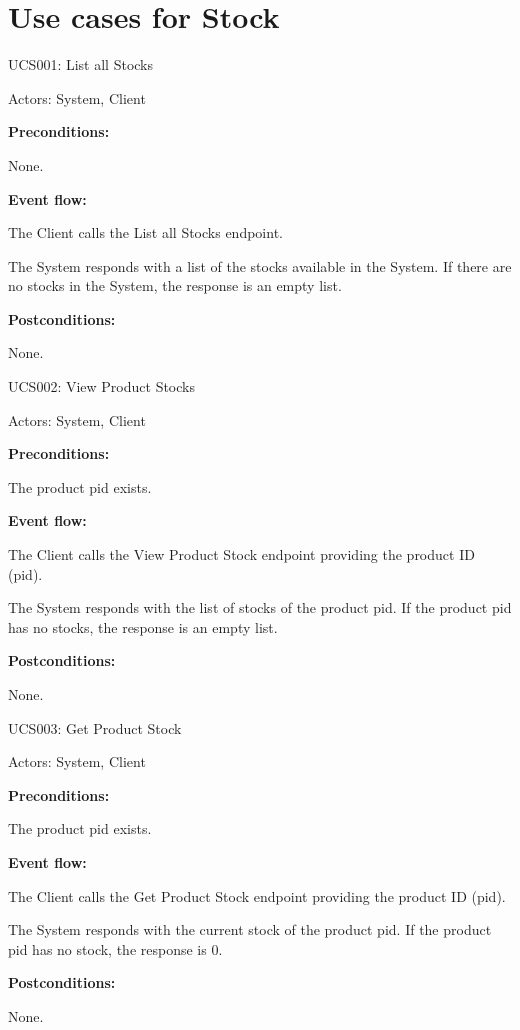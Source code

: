 \section{Use cases for Stock}

\begin{ucbox}{UCS001: List all Stocks}
\label{UCS001}

Actors: System, Client

\textbf{Preconditions:}

\ucitem None.

\textbf{Event flow:}

\ucitem The Client calls the List all Stocks endpoint.

\ucitem The System responds with a list of the stocks available in the System. If there are no stocks in the System, the response is an empty list.

\textbf{Postconditions:}

\ucitem None.

\end{ucbox}

\begin{ucbox}{UCS002: View Product Stocks}
\label{UCS002}

Actors: System, Client

\textbf{Preconditions:}

\ucitem The product pid exists.

\textbf{Event flow:}

\ucitem The Client calls the View Product Stock endpoint providing the product ID (pid).

\ucitem The System responds with the list of stocks of the product pid. If the product pid has no stocks, the response is an empty list.

\textbf{Postconditions:}

\ucitem None.

\end{ucbox}

\begin{ucbox}{UCS003: Get Product Stock}
\label{UCS003}

Actors: System, Client

\textbf{Preconditions:}

\ucitem The product pid exists.

\textbf{Event flow:}

\ucitem The Client calls the Get Product Stock endpoint providing the product ID (pid).

\ucitem The System responds with the current stock of the product pid. If the product pid has no stock, the response is 0.

\textbf{Postconditions:}

\ucitem None.

\end{ucbox}

